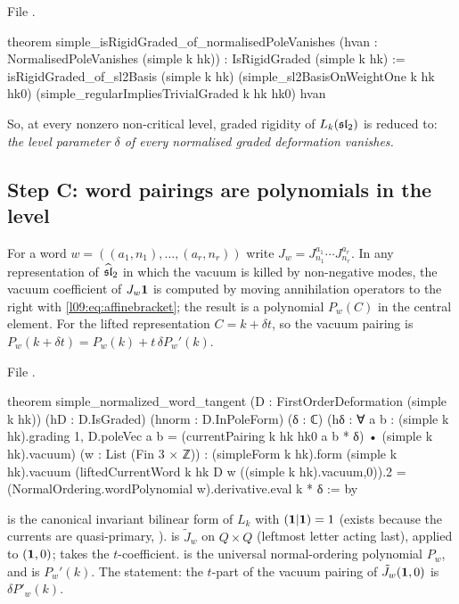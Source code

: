 \noindent File .
\begin{leancode}
theorem simple_isRigidGraded_of_normalisedPoleVanishes
    (hvan : NormalisedPoleVanishes (simple k hk)) : IsRigidGraded (simple k hk) :=
  isRigidGraded_of_sl2Basis (simple k hk) (simple_sl2BasisOnWeightOne k hk hk0)
    (simple_regularImpliesTrivialGraded k hk hk0) hvan
\end{leancode}
So, at every nonzero non-critical level, graded rigidity of $L_k(\mathfrak{sl}_2)$ is reduced to: \emph{the
level parameter $\delta$ of every normalised graded deformation vanishes.}

\subsection{Step C: word pairings are polynomials in the level}

For a word $w = ((a_1,n_1),\ldots,(a_r,n_r))$ write $J_w = J^{a_1}_{n_1}\cdots J^{a_r}_{n_r}$. In any
representation of $\widehat{\mathfrak{sl}}_2$ in which the vacuum is killed by non-negative modes, the vacuum
coefficient of $J_w\mathbf{1}$ is computed by moving annihilation operators to the right with
\eqref{l09:eq:affinebracket}; the result is a polynomial $P_w(C)$ in the central element. For the
lifted representation $C = k + \delta t$, so the vacuum pairing is $P_w(k+\delta t) = P_w(k) + t\,\delta P_w'(k)$.

\noindent File .
\begin{leancode}
theorem simple_normalized_word_tangent (D : FirstOrderDeformation (simple k hk))
    (hD : D.IsGraded) (hnorm : D.InPoleForm) (δ : ℂ)
    (hδ : ∀ a b : (simple k hk).grading 1,
      D.poleVec a b = (currentPairing k hk hk0 a b * δ) • (simple k hk).vacuum)
    (w : List (Fin 3 × ℤ)) :
    (simpleForm k hk).form (simple k hk).vacuum
      (liftedCurrentWord k hk D w ((simple k hk).vacuum,0)).2 =
        (NormalOrdering.wordPolynomial w).derivative.eval k * δ := by
\end{leancode}

\begin{dictionary}
 is the canonical invariant bilinear form of $L_k$ with $(\mathbf{1}|\mathbf{1})=1$
(exists because the currents are quasi-primary, ).  is $\tilde J_w$ on $Q\times Q$ (leftmost letter acting last), applied to $(\mathbf{1},0)$; 
takes the $t$-coefficient.  is the universal normal-ordering
polynomial $P_w$, and  is $P_w'(k)$. The statement: the $t$-part of the
vacuum pairing of $\tilde J_w(\mathbf{1},0)$ is $\delta P'_w(k)$.
\end{dictionary}

